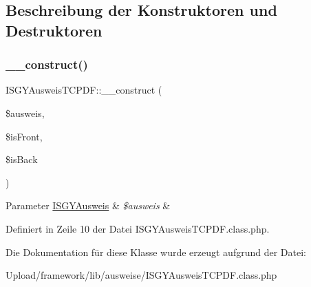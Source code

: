\subsection{Beschreibung der Konstruktoren und Destruktoren}
\mbox{\label{class_i_s_g_y_ausweis_t_c_p_d_f_a9326dfeda1bfaffb545e180e2790a73a}} 
\subsubsection{\texorpdfstring{\+\_\+\+\_\+construct()}{\_\_construct()}}
{\footnotesize\ttfamily I\+S\+G\+Y\+Ausweis\+T\+C\+P\+D\+F\+::\+\_\+\+\_\+construct (\begin{DoxyParamCaption}\item[{}]{\$ausweis,  }\item[{}]{\$is\+Front,  }\item[{}]{\$is\+Back }\end{DoxyParamCaption})}


\begin{DoxyParams}[1]{Parameter}
\mbox{\hyperlink{class_i_s_g_y_ausweis}{I\+S\+G\+Y\+Ausweis}} & {\em \$ausweis} & \\
\hline
\end{DoxyParams}


Definiert in Zeile 10 der Datei I\+S\+G\+Y\+Ausweis\+T\+C\+P\+D\+F.\+class.\+php.



Die Dokumentation für diese Klasse wurde erzeugt aufgrund der Datei\+:\begin{DoxyCompactItemize}
\item 
Upload/framework/lib/ausweise/I\+S\+G\+Y\+Ausweis\+T\+C\+P\+D\+F.\+class.\+php\end{DoxyCompactItemize}
